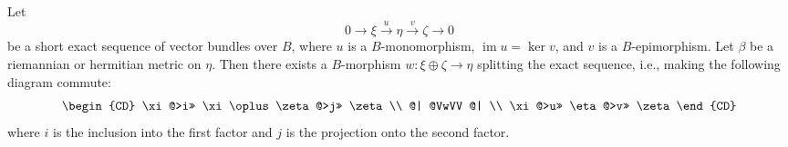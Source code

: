 Let
$$0 \rightarrow \xi \xrightarrow{u} \eta \xrightarrow{v} \zeta \rightarrow 0$$
be a short exact sequence of vector bundles over $B$, where $u$ is a $B$-monomorphism, $\operatorname{im} u = \ker v$, and $v$ is a $B$-epimorphism. Let $\beta$ be a riemannian or hermitian metric on $\eta$. Then there exists a $B$-morphism $w: \xi \oplus \zeta \rightarrow \eta$ splitting the exact sequence, i.e., making the following diagram commute:
\[
\begin{CD}
\xi @>i>> \xi \oplus \zeta @>j>> \zeta \\
@| @VwVV @| \\
\xi @>u>> \eta @>v>> \zeta
\end{CD}
\]
where $i$ is the inclusion into the first factor and $j$ is the projection onto the second factor.
